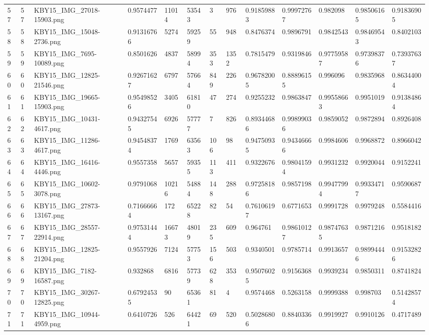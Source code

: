 \documentclass[11pt, a4paper, twoside]{report}
\begin{document}
\begin{longtable}[c]{@{}lllllllllllll@{}}
57 & 57 & KBY15\_IMG\_27018-15903.png & 0.9574477 & 11014 & 53543 & 3 & 976 & 0.91859883 & 0.99972767 & 0.982098 & 0.98506165 & 0.91836905 \\
58 & 58 & KBY15\_IMG\_15048-2736.png & 0.91316766 & 5274 & 59259 & 55 & 948 & 0.8476374 & 0.9896791 & 0.9842543 & 0.98469543 & 0.8402103 \\
59 & 59 & KBY15\_IMG\_7695-10089.png & 0.8501626 & 4837 & 58994 & 353 & 1352 & 0.7815479 & 0.9319846 & 0.97759587 & 0.97398376 & 0.73937637 \\
60 & 60 & KBY15\_IMG\_12825-21546.png & 0.92671627 & 6797 & 57664 & 849 & 226 & 0.96782005 & 0.88896155 & 0.996096 & 0.9835968 & 0.86344004 \\
61 & 61 & KBY15\_IMG\_19665-15903.png & 0.95498526 & 3405 & 61810 & 47 & 274 & 0.9255232 & 0.9863847 & 0.99558663 & 0.9951019 & 0.91384864 \\
62 & 62 & KBY15\_IMG\_10431-4617.png & 0.94327545 & 6926 & 57777 & 7 & 826 & 0.89344686 & 0.99899036 & 0.9859052 & 0.9872894 & 0.8926408 \\
63 & 63 & KBY15\_IMG\_11286-4617.png & 0.94548374 & 1769 & 63563 & 106 & 98 & 0.94750935 & 0.94346666 & 0.9984606 & 0.9968872 & 0.8966042 \\
64 & 64 & KBY15\_IMG\_16416-4446.png & 0.9557358 & 5657 & 59355 & 113 & 411 & 0.9322676 & 0.98041594 & 0.9931232 & 0.9920044 & 0.9152241 \\
65 & 65 & KBY15\_IMG\_10602-3078.png & 0.9791068 & 10216 & 54884 & 148 & 288 & 0.97258186 & 0.9857198 & 0.99477994 & 0.99334717 & 0.9590687 \\
66 & 66 & KBY15\_IMG\_27873-13167.png & 0.71666664 & 172 & 65228 & 82 & 54 & 0.76106197 & 0.6771653 & 0.9991728 & 0.9979248 & 0.5584416 \\
67 & 67 & KBY15\_IMG\_28557-22914.png & 0.97531444 & 16673 & 48019 & 235 & 609 & 0.964761 & 0.98610127 & 0.98747635 & 0.9871216 & 0.9518182 \\
68 & 68 & KBY15\_IMG\_12825-21204.png & 0.9557926 & 7124 & 57753 & 156 & 503 & 0.9340501 & 0.9785714 & 0.9913657 & 0.98994446 & 0.91532826 \\
69 & 69 & KBY15\_IMG\_7182-16587.png & 0.932868 & 6816 & 57739 & 628 & 353 & 0.95076025 & 0.9156368 & 0.9939234 & 0.9850311 & 0.8741824 \\
70 & 70 & KBY15\_IMG\_30267-12825.png & 0.67924535 & 90 & 65361 & 81 & 4 & 0.9574468 & 0.5263158 & 0.9999388 & 0.998703 & 0.51428574 \\
71 & 71 & KBY15\_IMG\_10944-4959.png & 0.6410726 & 526 & 64421 & 69 & 520 & 0.50286806 & 0.8840336 & 0.9919927 & 0.9910126 & 0.4717489 \\

\end{longtable}
\end{document}
